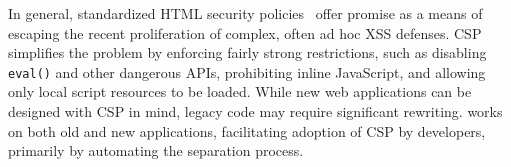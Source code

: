 In general, standardized HTML security policies~\cite{stamm10:csp,weinberger11:client} offer promise as a means of escaping the recent proliferation of complex, often ad hoc XSS defenses. CSP simplifies the problem by enforcing fairly strong restrictions, such as disabling \texttt{eval()} and other dangerous APIs, prohibiting inline JavaScript, and allowing only local script resources to be loaded. While new web applications can be designed with CSP in mind, legacy code may require significant rewriting. \dedacota works on both old and new applications, facilitating adoption of CSP by developers, primarily by automating the separation process.
